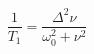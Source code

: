 \documentclass{jsarticle}
\begin{document}
\begin{equation}
  \frac{1}{T_{1}} = \frac{\Delta^{2} \nu}{\omega_{0}^{2} + \nu^{2}}
\end{equation}
\end{document}
